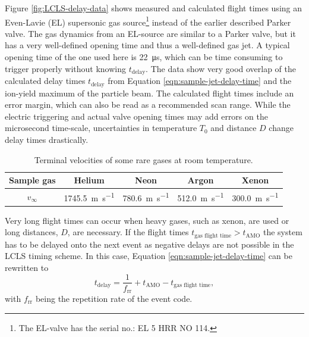 Figure \ref{fig:LCLS-delay-data} shows measured and calculated flight times using an Even-Lavie (EL) supersonic gas source\footnote{The EL-valve has the serial no.: EL 5 HRR NO 114.} instead of the earlier described Parker valve. The gas dynamics from an EL-source are similar to a Parker valve, but it has a very well-defined opening time and thus a well-defined gas jet. A typical opening time of the one used here is \SI{22}{\micro\second}, which can be time consuming to trigger properly without knowing $t_{\text{delay}}$. The data show very good overlap of the calculated delay times $t_{\text{delay}}$ from Equation \ref{eqn:sample-jet-delay-time} and the ion-yield maximum of the particle beam. The calculated flight times include an error margin, which can also be read as a recommended scan range. While the electric triggering and actual valve opening times may add errors on the microsecond time-scale, uncertainties in temperature $T_{0}$ and distance $D$ change delay times drastically.\\[1\baselineskip]
%
\begin{table}
\centering
\begin{tabular}{ | c | c | c | c | c | }
\hline
	\textbf{Sample gas} & \textbf{Helium} & \textbf{Neon} & \textbf{Argon} & \textbf{Xenon} \\ \hline
	$v_{\infty}$ & \SI{1745.5}{\meter\per\second} & \SI{780.6}{\meter\per\second} & \SI{512.0}{\meter\per\second} & \SI{300.0}{\meter\per\second} \\ \hline
\end{tabular}
\caption{Terminal velocities of some rare gases at room temperature.}
\label{tab:terminal-velocities}
\end{table}
%
Very long flight times can occur when heavy gases, such as xenon, are used or long distances, $D$, are necessary. If the flight times $t_{\text{gas flight time}} > t_{\text{AMO}}$ the system has to be delayed onto the next event as negative delays are not possible in the LCLS timing scheme. In this case, Equation \eqref{eqn:sample-jet-delay-time} can be rewritten to
\begin{equation}
t_{\text{delay}} = \frac{1}{f_{\text{rr}}} + t_{\text{AMO}} - t_{\text{gas flight time}},
\label{eqn:sample-jet-delay-time-next}
\end{equation}
with $f_{\text{rr}}$ being the repetition rate of the event code.
%
%
%
